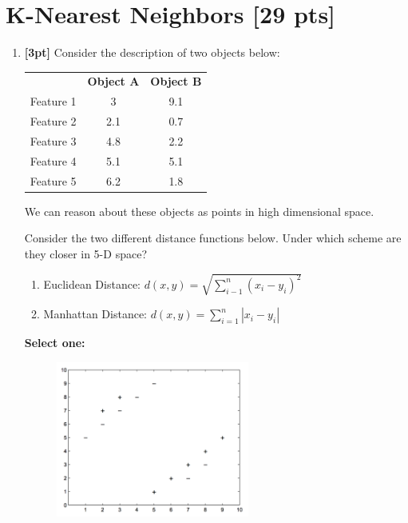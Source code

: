 \newpage
\section{K-Nearest Neighbors [29 pts]}


\begin{enumerate}
    \item \textbf{[3pt]} Consider the description of two objects below:
    
    \begin{table}[H]
        \centering
        \begin{tabular}{c c c}
             & \textbf{Object A} & \textbf{Object B} \\
            Feature 1 & 3 & 9.1 \\
            Feature 2 & 2.1 & 0.7 \\
            Feature 3 & 4.8 & 2.2 \\
            Feature 4 & 5.1 & 5.1 \\
            Feature 5 & 6.2 & 1.8 
        \end{tabular}
    \end{table}
    We can reason about these objects as points in high dimensional space.
    
    Consider the two different distance functions below. Under which scheme are they closer in 5-D space?
    \begin{enumerate}
        \item Euclidean Distance: $d(x,y) = \sqrt{\sum_{i-1}^n (x_i - y_i)^2}$
        \item Manhattan Distance: $d(x,y) = \sum_{i=1}^n |x_i - y_i|$
    \end{enumerate}
    
    \textbf{Select one:}

    
    
    \begin{figure}[H]
        \centering
        \includegraphics[width = 0.6\textwidth]{Q2_knn.png}
        \label{Q2_knn}
    \end{figure}


\end{enumerate}
